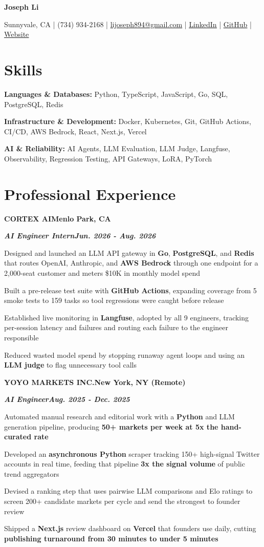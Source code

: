 \documentclass[10pt]{article}
\renewcommand{\resumeheader}[2]{%
  {\centering\fontsize{16}{18}\selectfont\bfseries #1\par}%
  \vspace{4pt}%
  {\centering\fontsize{10.5}{13}\selectfont #2\par}%
  \vspace{6pt}%
}
\renewcommand{\skill}[2]{\textbf{#1:} #2\par\vspace{1.5pt}}
\newcommand{\job}[4]{%
  \vspace{0pt}%
  \textbf{\MakeUppercase{#1}}\hfill\textbf{#2}\par
  \vspace{0.5pt}%
  \textbf{\textit{#3}}\hfill\textbf{\textit{#4}}\par
}
\begin{document}
\resumeheader{Joseph Li}{%
Sunnyvale, CA | (734) 934-2168 | \href{mailto:lijoseph894@gmail.com}{lijoseph894@gmail.com} | \href{https://www.linkedin.com/in/lijoseph894/}{\underline{LinkedIn}} | \href{https://github.com/josephl894}{\underline{GitHub}} | \href{https://josephl894.github.io}{\underline{Website}}}

\section{Skills}
\skill{Languages \& Databases}{Python, TypeScript, JavaScript, Go, SQL, PostgreSQL, Redis}
\skill{Infrastructure \& Development}{Docker, Kubernetes, Git, GitHub Actions, CI/CD, AWS Bedrock, React, Next.js, Vercel}
\skill{AI \& Reliability}{AI Agents, LLM Evaluation, LLM Judge, Langfuse, Observability, Regression Testing, API Gateways, LoRA, PyTorch}

\section{Professional Experience}
\job{Cortex AI}{Menlo Park, CA}{AI Engineer Intern}{Jun. 2026 - Aug. 2026}
\begin{bullets}
  \item Designed and launched an LLM API gateway in \textbf{Go}, \textbf{PostgreSQL}, and \textbf{Redis} that routes OpenAI, Anthropic, and \textbf{AWS Bedrock} through one endpoint for a 2,000-seat customer and meters \$10K in monthly model spend
  \item Built a pre-release test suite with \textbf{GitHub Actions}, expanding coverage from 5 smoke tests to 159 tasks so tool regressions were caught before release
  \item Established live monitoring in \textbf{Langfuse}, adopted by all 9 engineers, tracking per-session latency and failures and routing each failure to the engineer responsible
  \item Reduced wasted model spend by stopping runaway agent loops and using an \textbf{LLM judge} to flag unnecessary tool calls
\end{bullets}

\vspace{3pt}
\job{Yoyo Markets Inc.}{New York, NY (Remote)}{AI Engineer}{Aug. 2025 - Dec. 2025}
\begin{bullets}
  \item Automated manual research and editorial work with a \textbf{Python} and LLM generation pipeline, producing \textbf{50+ markets per week at 5x the hand-curated rate}
  \item Developed an \textbf{asynchronous Python} scraper tracking 150+ high-signal Twitter accounts in real time, feeding that pipeline \textbf{3x the signal volume} of public trend aggregators
  \item Devised a ranking step that uses pairwise LLM comparisons and Elo ratings to screen 200+ candidate markets per cycle and send the strongest to founder review
  \item Shipped a \textbf{Next.js} review dashboard on \textbf{Vercel} that founders use daily, cutting \textbf{publishing turnaround from 30 minutes to under 5 minutes}
\end{bullets}
\end{document}
